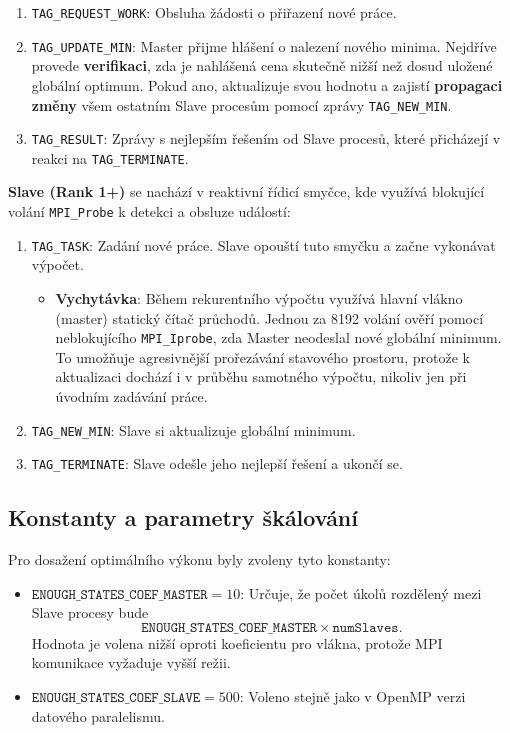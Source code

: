 \documentclass[11pt,a4paper]{article}
\begin{document}
\begin{enumerate}
    \item \texttt{TAG\_REQUEST\_WORK}: Obsluha žádosti o přiřazení nové práce.
    \item \texttt{TAG\_UPDATE\_MIN}: Master přijme hlášení o nalezení nového minima. Nejdříve provede \textbf{verifikaci}, zda je nahlášená cena skutečně nižší než dosud uložené globální optimum. Pokud ano, aktualizuje svou hodnotu a zajistí \textbf{propagaci změny} všem ostatním Slave procesům pomocí zprávy \texttt{TAG\_NEW\_MIN}.
    \item \texttt{TAG\_RESULT}: Zprávy s nejlepším řešením od Slave procesů, které přicházejí v reakci na \texttt{TAG\_TERMINATE}.
\end{enumerate}
\noindent
\textbf{Slave (Rank 1+)} se nachází v reaktivní řídicí smyčce, kde využívá blokující volání \texttt{MPI\_Probe} k detekci a obsluze událostí:
\begin{enumerate}
    \item \texttt{TAG\_TASK}: Zadání nové práce. Slave opouští tuto smyčku a začne vykonávat výpočet.
    \begin{itemize}
        \item \textbf{Vychytávka}: Během rekurentního výpočtu využívá hlavní vlákno (master) statický čítač průchodů. Jednou za 8192 volání ověří pomocí neblokujícího \texttt{MPI\_Iprobe}, zda Master neodeslal nové globální minimum. To umožňuje agresivnější prořezávání stavového prostoru, protože k aktualizaci dochází i v průběhu samotného výpočtu, nikoliv jen při úvodním zadávání práce.
    \end{itemize}
    \item \texttt{TAG\_NEW\_MIN}: Slave si aktualizuje globální minimum.
    \item \texttt{TAG\_TERMINATE}: Slave odešle jeho nejlepší řešení a ukončí se.
\end{enumerate}

\subsection{Konstanty a parametry škálování}
Pro dosažení optimálního výkonu byly zvoleny tyto konstanty:
\begin{itemize}
    \item $\texttt{ENOUGH\_STATES\_COEF\_MASTER} = 10$: Určuje, že počet úkolů rozdělený mezi Slave procesy bude
    $$\texttt{ENOUGH\_STATES\_COEF\_MASTER} \times \texttt{numSlaves}.$$ Hodnota je volena nižší oproti koeficientu pro vlákna, protože MPI komunikace vyžaduje vyšší režii.
    \item $\texttt{ENOUGH\_STATES\_COEF\_SLAVE} = 500$: Voleno stejně jako v OpenMP verzi datového paralelismu.
\end{itemize}
\end{document}
